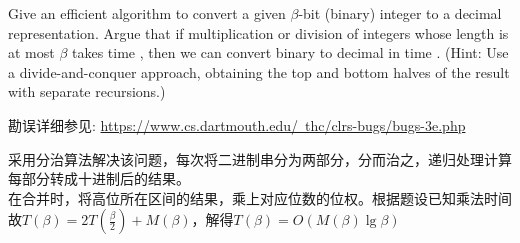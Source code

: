 \documentclass[a4paper, justified]{tufte-handout}
\begin{document}
\begin{problem}[TC 31.1-13(有勘误)]
Give an efficient algorithm to convert a given $\beta$-bit (binary) integer to a decimal representation. 
Argue that if multiplication or division of integers whose length is at most $\beta$ takes time , 
then we can convert binary to decimal in time . (Hint: Use a divide-and-conquer approach, obtaining the top and
bottom halves of the result with separate recursions.)

勘误详细参见: \href{https://www.cs.dartmouth.edu/~thc/clrs-bugs/bugs-3e.php}{https://www.cs.dartmouth.edu/~thc/clrs-bugs/bugs-3e.php}
\end{problem}

\begin{solution}
采用分治算法解决该问题，每次将二进制串分为两部分，分而治之，递归处理计算每部分转成十进制后的结果。\\
在合并时，将高位所在区间的结果，乘上对应位数的位权。根据题设已知乘法时间\\
故$T(\beta)=2T(\frac{\beta}{2})+M(\beta)$，解得$T(\beta)=O(M(\beta)\lg\beta)$
\end{solution}

\begin{problem}[TC 31.2-9]
\end{problem}
\end{document}
